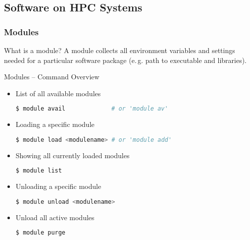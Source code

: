 \subsection{Software on HPC Systems}

\begin{frame}
  \frametitle{Modules}
  \vspace{-1.3em}
  \begin{block}{What is a module?}
    A module collects all environment variables and settings needed for a particular software package (e.\,g. path to executable and libraries).
  \end{block}

  \vfill
\end{frame}


\begin{frame}[fragile]
  {Modules -- Command Overview}
  \vspace{-1em}
  \begin{itemize}
    \setlength\itemsep{-0.1em}
  \item List of all available modules
    \begin{lstlisting}[language=Bash, style=Shell]
$ module avail             # or 'module av'
    \end{lstlisting}
  \item Loading a specific module
    \begin{lstlisting}[language=Bash, style=Shell]
$ module load <modulename> # or 'module add'
    \end{lstlisting}
  \item Showing all currently loaded modules
    \begin{lstlisting}[language=Bash, style=Shell]
$ module list
    \end{lstlisting}
  \item Unloading a specific module
    \begin{lstlisting}[language=Bash, style=Shell]
$ module unload <modulename>
    \end{lstlisting}
  \item Unload all active modules
    \begin{lstlisting}[language=Bash, style=Shell]
$ module purge
    \end{lstlisting}
  \end{itemize}
  \vfill
\end{frame}

